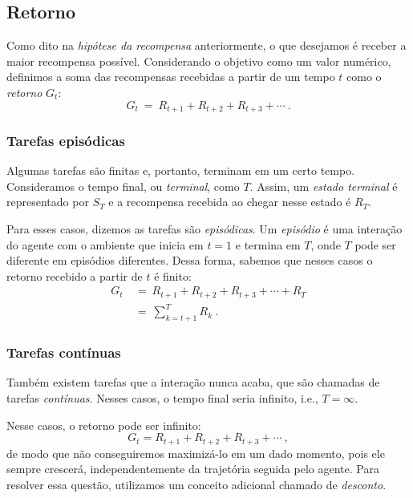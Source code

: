 \documentclass{article}
\begin{document}
        \subsection{Retorno}

            Como dito na \emph{hipótese da recompensa} anteriormente, o que desejamos é receber a maior recompensa possível. Considerando o objetivo como um valor numérico, definimos a soma das recompensas recebidas a partir de um tempo $t$ como o \emph{retorno} $G_t$:
            \begin{equation}
                G_t \ = \ R_{t+1} + R_{t+2} + R_{t+3} + \cdots\ .
            \end{equation}

            \subsubsection{Tarefas episódicas}

                Algumas tarefas são finitas e, portanto, terminam em um certo tempo. Consideramos o tempo final, ou \emph{terminal}, como $T$. Assim, um \emph{estado terminal} é representado por $S_T$ e a recompensa recebida ao chegar nesse estado é $R_T$.
                
                Para esses casos, dizemos as tarefas são \emph{episódicas}. Um \emph{episódio} é uma interação do agente com o ambiente que inicia em $t = 1$ e termina em $T$, onde $T$ pode ser diferente em episódios diferentes. Dessa forma, sabemos que nesses casos o retorno recebido a partir de $t$ é finito:
                \begin{equation}
                \begin{split}
                    G_t & \ = \ R_{t+1} + R_{t+2} + R_{t+3} + \cdots + R_T \\
                    & \ = \ \sum_{k=t+1}^{T} R_k\ .
                \end{split}
                \end{equation}

            \subsubsection{Tarefas contínuas}
        
                Também existem tarefas que a interação nunca acaba, que são chamadas de tarefas \emph{contínuas}. Nesses casos, o tempo final seria infinito, i.e., $T = \infty$. 

                Nesse casos, o retorno pode ser infinito:
                \begin{equation}
                    G_t = R_{t+1} + R_{t+2} + R_{t+3} + \cdots\ ,
                \end{equation}
                de modo que não conseguiremos maximizá-lo em um dado momento, pois ele sempre crescerá, independentemente da trajetória seguida pelo agente. Para resolver essa questão, utilizamos um conceito adicional chamado de \emph{desconto}.
        
\end{document}
